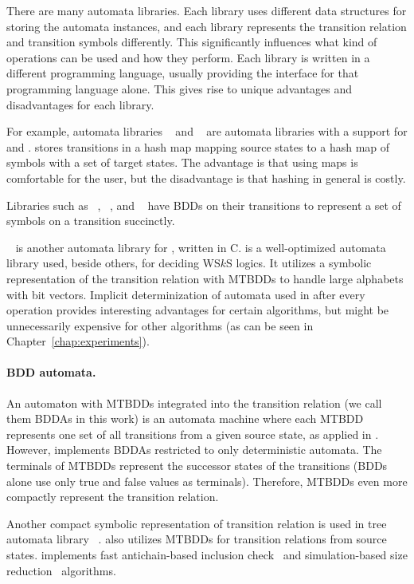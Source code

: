 There are many automata libraries.
Each library uses different data structures for storing the automata instances,
and each library represents the transition relation and transition symbols differently.
This significantly influences what kind of operations can be used and how they perform.
Each library is written in a different programming language, usually providing the interface for that programming language alone.
This gives rise to unique advantages and disadvantages for each library.

For example, automata libraries \fado~\cite{fado} and \automatapy~\cite{automatapy} are automata libraries with a support for \nfas and \dfas.
\automatapy stores transitions in a hash map mapping source states to a hash map of symbols with a set of target states.
The advantage is that using maps is comfortable for the user, but the disadvantage is that hashing in general is costly.

Libraries such as \spot~\cite{spot}, \mosel~\cite{mosel}, and \owl~\cite{owl} have BDDs on their transitions to represent a set of symbols on a transition succinctly.

\mona~\cite{mona} is another automata library for \dfas, written in C.
\mona is a well-optimized automata library used, beside others, for deciding WS$k$S logics.
It utilizes a symbolic representation of the transition relation with MTBDDs to handle large alphabets with bit vectors.
Implicit determinization of automata used in \mona after every operation provides interesting advantages for certain algorithms, but might be unnecessarily expensive for other algorithms (as can be seen in Chapter~\ref{chap:experiments}).

\paragraph{BDD automata.}
An automaton with MTBDDs integrated into the transition relation (we call them BDDAs in this work) is an automata machine where each MTBDD represents one set of all transitions from a given source state, as applied in \mona.
However, \mona implements BDDAs restricted to only deterministic automata.
The terminals of MTBDDs represent the successor states of the transitions (BDDs alone use only true and false values as terminals).
Therefore, MTBDDs even more compactly represent the transition relation.

Another compact symbolic representation of transition relation is used in tree automata library \vata~\cite{vata}.
\vata also utilizes MTBDDs for transition relations from source states.
\vata implements fast antichain-based inclusion check~\cite{doyen-antichain-10} and simulation-based size reduction~\cite{ranzato_efficient_2010, treesimulation08} algorithms.

